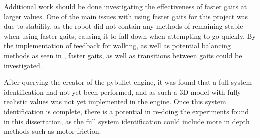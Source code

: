  Additional work should be done investigating the effectiveness of faster gaits at larger values. One of the main issues with using faster gaits for this project was due to stability, as the robot did not contain any methods of remaining stable when using faster gaits, causing it to fall down when attempting to go quickly. By the implementation of feedback for walking, as well as potential balancing methods as seen in \cite{}, faster gaits, as well as transitions between gaits could be investigated.

After querying the creator of the pybullet engine, it was found that a full system identification had not yet been performed, and as such a 3D model with fully realistic values was not yet implemented in the engine. Once this system identification is complete, there is a potential in re-doing the experiments found in this dissertation, as the full system identification could include more in depth methods such as motor friction.





